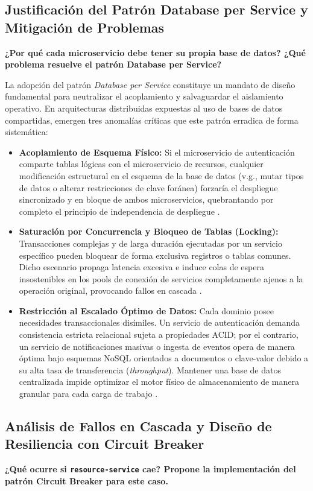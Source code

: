 \documentclass[12pt,journal,onecolumn]{IEEEtran}
\begin{document}
\subsection{\textbf{Justificación del Patrón Database per Service y Mitigación de Problemas}}
\textbf{¿Por qué cada microservicio debe tener su propia base de datos? ¿Qué problema resuelve el patrón Database per Service?}

La adopción del patrón \textit{Database per Service} constituye un mandato de diseño fundamental para neutralizar el acoplamiento y salvaguardar el aislamiento operativo. En arquitecturas distribuidas expuestas al uso de bases de datos compartidas, emergen tres anomalías críticas que este patrón erradica de forma sistemática:
\begin{itemize}
    \item \textbf{Acoplamiento de Esquema Físico:} Si el microservicio de autenticación comparte tablas lógicas con el microservicio de recursos, cualquier modificación estructural en el esquema de la base de datos (v.g., mutar tipos de datos o alterar restricciones de clave foránea) forzaría el despliegue sincronizado y en bloque de ambos microservicios, quebrantando por completo el principio de independencia de despliegue \cite{newman2021, richardson2018}.
    \item \textbf{Saturación por Concurrencia y Bloqueo de Tablas (Locking):} Transacciones complejas y de larga duración ejecutadas por un servicio específico pueden bloquear de forma exclusiva registros o tablas comunes. Dicho escenario propaga latencia excesiva e induce colas de espera insostenibles en los pools de conexión de servicios completamente ajenos a la operación original, provocando fallos en cascada \cite{richardson2018}.
    \item \textbf{Restricción al Escalado Óptimo de Datos:} Cada dominio posee necesidades transaccionales disímiles. Un servicio de autenticación demanda consistencia estricta relacional sujeta a propiedades ACID; por el contrario, un servicio de notificaciones masivas o ingesta de eventos opera de manera óptima bajo esquemas NoSQL orientados a documentos o clave-valor debido a su alta tasa de transferencia (\textit{throughput}). Mantener una base de datos centralizada impide optimizar el motor físico de almacenamiento de manera granular para cada carga de trabajo \cite{newman2021}.
\end{itemize}

\subsection{Análisis de Fallos en Cascada y Diseño de Resiliencia con Circuit Breaker}
\textbf{¿Qué ocurre si \texttt{resource-service} cae? Propone la implementación del patrón Circuit Breaker para este caso.}
\end{document}

